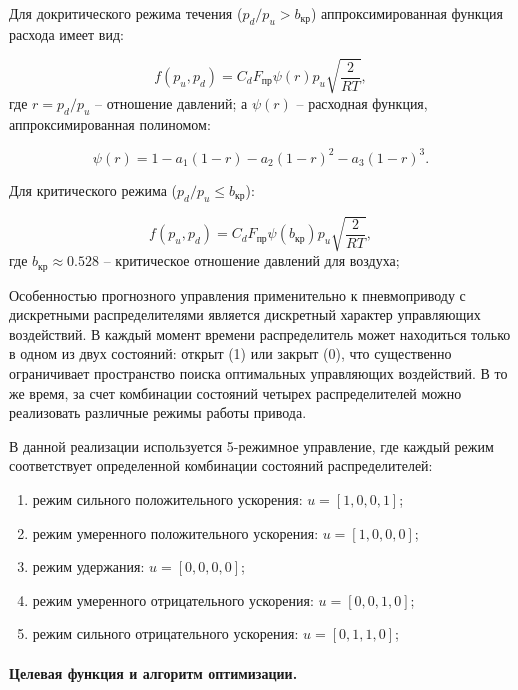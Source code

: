 Для докритического режима течения ($p_d/p_u > b_{\text{кр}}$) аппроксимированная функция расхода имеет вид:

\begin{equation}
	f(p_u, p_d) = C_d F_\text{пр} \psi(r) p_u \sqrt{\frac{2}{RT}},
\end{equation}
где $r = p_d/p_u$ -- отношение давлений;
а $\psi(r)$ -- расходная функция, аппроксимированная полиномом:

\begin{equation}
	\psi(r) = 1 - a_1(1-r) - a_2(1-r)^2 - a_3(1-r)^3.
\end{equation}

Для критического режима ($p_d/p_u \leq b_{\text{кр}}$):

\begin{equation}
	f(p_u, p_d) = C_d F_\text{пр} \psi(b_{\text{кр}}) p_u \sqrt{\frac{2}{RT}},
\end{equation}
где $b_{\text{кр}} \approx \num{0.528}$ -- критическое отношение давлений для воздуха;

Особенностью прогнозного управления применительно к пневмоприводу с дискретными
распределителями является дискретный характер управляющих воздействий. В каждый момент времени
распределитель может находиться только в одном из двух состояний: открыт (1) или закрыт (0), что
существенно ограничивает пространство поиска оптимальных управляющих воздействий.
В то же время, за счет комбинации состояний четырех распределителей можно реализовать различные режимы работы привода.

В данной реализации используется 5-режимное управление, где каждый режим
соответствует определенной комбинации состояний распределителей:

\begin{enumerate}[label=\arabic*)]
	\item режим сильного положительного ускорения: $u = [1, 0, 0, 1]$;
	\item режим умеренного положительного ускорения: $u = [1, 0, 0, 0]$;
	\item режим удержания: $u = [0, 0, 0, 0]$;
	\item режим умеренного отрицательного ускорения: $u = [0, 0, 1, 0]$;
	\item режим сильного отрицательного ускорения: $u = [0, 1, 1, 0]$;
\end{enumerate}

\paragraph*{Целевая функция и алгоритм оптимизации.}

